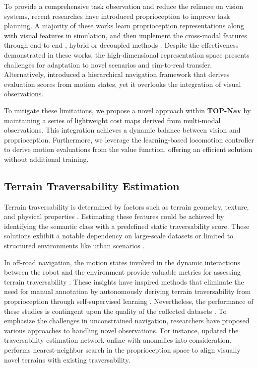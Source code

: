 \documentclass[conference]{IEEEtran}
\begin{document}
To provide a comprehensive task observation and reduce the reliance on vision systems, recent researches have introduced proprioception to improve task planning. A majority of these works learn proprioception representations along with visual features in simulation, and then implement the cross-modal features through end-to-end \cite{yang2021learning}, hybrid \cite{he2024agile} or decoupled methods \cite{zhang2024resilient}. Despite the effectiveness demonstrated in these works, the high-dimensional representation space presents challenges for adaptation to novel scenarios and sim-to-real transfer. Alternatively, \citet{fu2022coupling} introduced a hierarchical navigation framework that derives evaluation scores from motion states, yet it overlooks the integration of visual observations.

To mitigate these limitations, we propose a novel approach within \textbf{TOP-Nav} by maintaining a series of lightweight cost maps derived from multi-modal observations. This integration achieves a dynamic balance between vision and proprioception. Furthermore, we leverage the learning-based locomotion controller to derive motion evaluations from the value function, offering an efficient solution without additional training.

\subsection{Terrain Traversability Estimation} 

Terrain traversability is determined by factors such as terrain geometry, texture, and physical properties \cite{frey2024roadrunner}. Estimating these features could be achieved by identifying the semantic class with a predefined static traversability score\cite{roth2023viplanner,guan2022ga, viswanath2021offseg,ewen2022these}. These solutions exhibit a notable dependency on large-scale datasets \cite{meng2023terrainnet} or limited to structured environments like urban scenarios \cite{cordts2016cityscapes,abu2018augmented}.

{In off-road navigation, the motion states involved in the dynamic interactions between the robot and the environment provide valuable metrics for assessing terrain traversability \cite{fan2021step}. These insights have inspired methods that eliminate the need for manual annotation by autonomously deriving terrain traversability from proprioception through self-supervised learning \cite{yao2022rca,cai2023evora,jung2023v,karnan2023sterling,elnoor2023pronav,margolis2023learning}. Nevertheless, the performance of these studies is contingent upon the quality of the collected datasets \cite{frey2024roadrunner}. To emphasize the challenges in unconstrained navigation, researchers have proposed various approaches to handling novel observations. For instance, \citet{frey2023fast} updated the traversability estimation network online with anomalies into consideration. \citet{karnan2023wait} performs nearest-neighbor search in the proprioception space to align visually novel terrains with existing traversability.}
\end{document}
